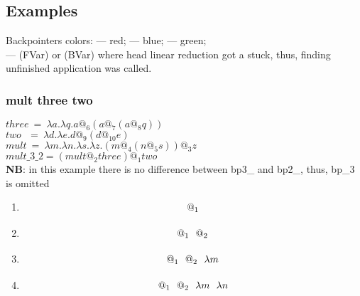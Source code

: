 \documentclass[a4paper, 10pt]{article}
\newcommand{\tikzmark}[3][]{\tikz[remember picture,baseline] \node [inner xsep=0pt,anchor=base,#1](#2) {#3};}
\begin{document}
\begin{landscape}

\subsection{Examples}
Backpointers colors: {\color{red}{bp2}} --- red; {\color{blue}{bp3}} --- blue; {\color{green}{bp4}} --- green;\\
{\color{blue}{Blue tokens}} --- (FVar) or (BVar) where head linear reduction got a stuck, thus, finding unfinished application was called.

\subsubsection{mult three two}
$three\ =\ \lambda a . \lambda q . a @_6 (a @_7 (a @_8 q))$\\
$two\ \ \ =\ \lambda d . \lambda e . d @_9 (d @_10 e)$\\
$mult\ =\ \lambda m . \lambda n . \lambda s . \lambda z . (m @_4 (n @_5 s)) @_3 z$\\
$mult\_3\_2 = (mult @_2 three) @_1 two$\\
\textbf{NB}: in this example there is no difference between bp3\_ and bp2\_, thus, bp\_3 is omitted
\begin{enumerate}
\item
\[\tikzmark{1}{$@_1$}\]
\item
\[\tikzmark{1}{$@_1$}\ \ \tikzmark{2}{$@_2$}\]
\item
\[\tikzmark{1}{$@_1$}\ \ \tikzmark{2}{$@_2$}\ \ \tikzmark{3}{$\lambda m$}\]
\item
\[\tikzmark{1}{$@_1$}\ \ \tikzmark{2}{$@_2$}\ \ \tikzmark{3}{$\lambda m$}\ \ \tikzmark{4}{$\lambda n$}\]
\end{enumerate}
\end{landscape}
\end{document}
